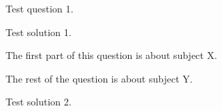 \documentclass{uob-cs-exam} %
\begin{document}
\maketitle

  \begin{questions}

    \question[10] Test question 1.

    \begin{solution}
      Test solution 1.
    \end{solution}

    \question[10]
      The first part of this question is about subject X.

      The rest of the question is about subject Y.

    \begin{solution}
      Test solution 2.
    \end{solution}

  \end{questions}

  \nomorequestions
\end{document}
